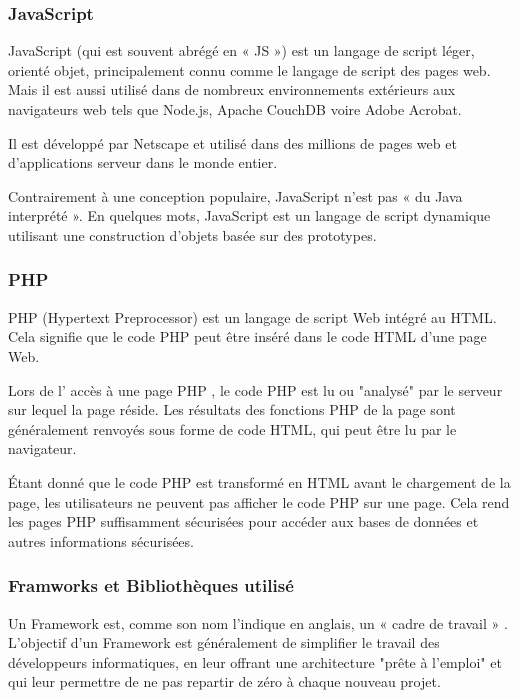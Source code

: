 \documentclass[french]{report}
\begin{document}
\subsubsection{JavaScript}

JavaScript (qui est souvent abrégé en « JS ») est un langage de script léger,
orienté objet, principalement connu comme le langage de script des pages web.
Mais il est aussi utilisé dans de nombreux environnements extérieurs aux
navigateurs web tels que Node.js, Apache CouchDB voire Adobe Acrobat. \cite{js}

Il est développé par Netscape et utilisé dans des millions de pages web et
d'applications serveur dans le monde entier.\cite{js}

Contrairement à une conception populaire, JavaScript n'est pas « du Java
interprété ». En quelques mots, JavaScript est un langage de script dynamique
utilisant une construction d'objets basée sur des prototypes.\cite{js}

\subsubsection{PHP }

PHP (Hypertext Preprocessor) est un langage de script Web intégré au HTML. Cela
signifie que le code PHP peut être inséré dans le code HTML d'une page Web.
\cite{php}

Lors de l' accès à une page PHP , le code PHP est lu ou "analysé" par le serveur
sur lequel la page réside. Les résultats des fonctions PHP de la page sont
généralement renvoyés sous forme de code HTML, qui peut être lu par le
navigateur.\cite{php}

Étant donné que le code PHP est transformé en HTML avant le chargement de la
page, les utilisateurs ne peuvent pas afficher le code PHP sur une page. Cela
rend les pages PHP suffisamment sécurisées pour accéder aux bases de données et
autres informations sécurisées.\cite{php}

\subsubsection{Framworks et Bibliothèques utilisé}

Un Framework est, comme son nom l'indique en anglais, un «  cadre de travail » .
L'objectif d'un Framework est généralement de simplifier le travail des
développeurs informatiques, en leur offrant une architecture "prête à l'emploi"
et qui leur permettre de ne pas repartir de zéro à chaque nouveau projet.
\end{document}
